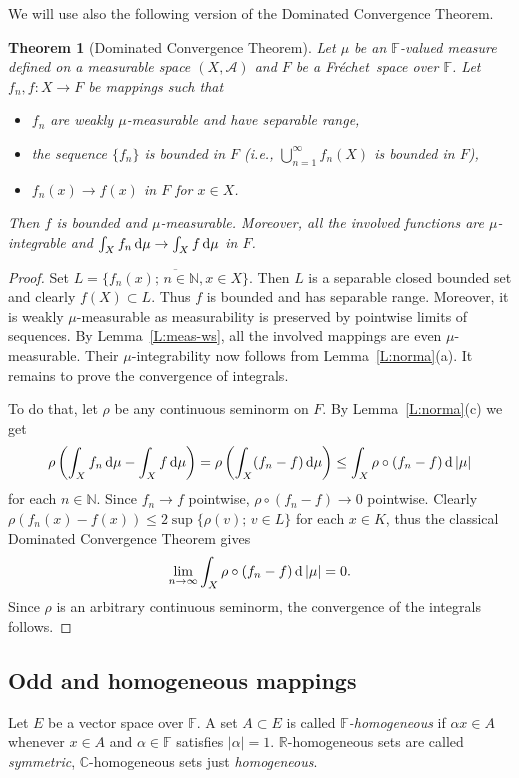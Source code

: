 \documentclass{amsart}
\numberwithin{equation}{section}
\newtheorem{thm}{Theorem}[section]
\theoremstyle{definition}
\def\A{\mathcal A}
\def\ce{\mathbb C}
\def\en{\mathbb N}
\def\ef{\mathbb F}
\def\er{\mathbb R}
\def\ov{\overline}
\def\di{\,\mbox{\rm d}}
\newcommand{\abs}[1]{\left| #1  \right|}
\newcommand{\setsep}{;\,}
\newcommand{\fr}{Fr\'echet\ }
\begin{document}
We will use also the following version of the Dominated Convergence Theorem.

\begin{thm}[Dominated Convergence Theorem]
\label{T:dct}
Let $\mu$ be an $\ef$-valued measure defined on a measurable space $(X,\A)$ and $F$ be a \fr space over $\ef$.
Let $f_n,f\colon X\to F$ be mappings such that
\begin{itemize}
\item $f_n$ are weakly $\mu$-measurable and have separable range,
\item the sequence $\{f_n\}$ is bounded in $F$ (i.e., $\bigcup_{n=1}^\infty f_n(X)$ is bounded in $F$),
\item $f_n(x)\to f(x)$ in $F$ for $x\in X$.
\end{itemize}
Then $f$ is bounded and $\mu$-measurable. Moreover, all the involved functions are $\mu$-integrable and $\int_X f_n\di\mu\to \int_X f\di\mu$ in $F$.
\end{thm}

\begin{proof} Set $L=\ov{\{f_n(x)\setsep n\in\en, x\in X\}}$. Then $L$ is a separable closed bounded set and clearly $f(X)\subset L$. Thus $f$ is bounded and has separable range. Moreover, it is weakly $\mu$-measurable as measurability is preserved by pointwise limits of sequences. By Lemma~\ref{L:meas-ws}, all the involved mappings are even $\mu$-measurable. Their $\mu$-integrability now follows from Lemma~\ref{L:norma}(a). It remains to prove the convergence of integrals.

To do that, let $\rho$ be any continuous seminorm on $F$. By Lemma~\ref{L:norma}(c) we get
$$\rho\left(\int_X f_n\di\mu-\int_X f\di\mu\right)=\rho\left(\int_X (f_n-f)\di\mu\right)\le \int_X\rho\circ(f_n-f)\di\abs{\mu}$$
for each $n\in\en$. Since $f_n\to f$ pointwise, $\rho\circ(f_n- f)\to 0$ pointwise.
Clearly $\rho(f_n(x)-f(x))\le 2\sup\{\rho(v)\setsep v\in L\}$ for each $x\in K$,
thus the classical Dominated Convergence Theorem gives
\[
\lim_{n\to \infty}\int_X \rho\circ(f_n-f)\di\abs{\mu}=0.
\]
Since $\rho$ is an arbitrary continuous seminorm, the convergence of the integrals follows.
\end{proof}


\subsection{Odd and homogeneous mappings}

Let $E$ be a vector space over $\ef$. A set $A\subset E$ is called \emph{$\ef$-homogeneous} if $\alpha x\in A$ whenever $x\in A$ and $\alpha\in \ef$ satisfies $|\alpha|=1$. $\er$-homogeneous sets are called \emph{symmetric}, $\ce$-homogeneous sets just \emph{homogeneous}.
\end{document}
